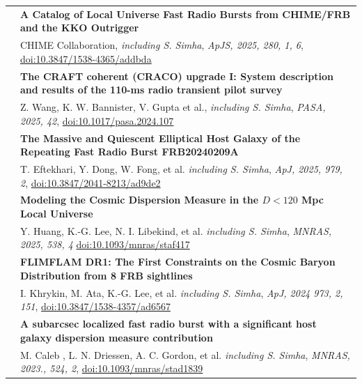 \documentclass[letterpaper, 11pt]{article}
\begin{document}
\begin{longtable}{p{1.3in}p{4.8in}}
& \textbf{A Catalog of Local Universe Fast Radio Bursts from CHIME/FRB and the KKO Outrigger}\\
& CHIME Collaboration, \textit{including S. Simha}, \textit{ApJS, 2025, 280, 1, 6}, \href{https://ui.adsabs.harvard.edu/link_gateway/2025ApJS..280....6C/doi:10.3847/1538-4365/addbda}{doi:10.3847/1538-4365/addbda}\\
& \textbf{The CRAFT coherent (CRACO) upgrade I: System description and results of the 110-ms radio transient pilot survey}\\
& Z. Wang, K. W. Bannister, V. Gupta et al., \textit{including S. Simha}, \textit{PASA, 2025, 42}, \href{https://ui.adsabs.harvard.edu/link_gateway/2025PASA...42....5W/doi:10.1017/pasa.2024.107}{doi:10.1017/pasa.2024.107}\\

& \textbf{The Massive and Quiescent Elliptical Host Galaxy of the Repeating Fast Radio Burst FRB20240209A} \\
& T. Eftekhari, Y. Dong, W. Fong, et al. \textit{including S. Simha}, \textit{ApJ,  2025, 979, 2}, \href{https://ui.adsabs.harvard.edu/link_gateway/2025ApJ...979L..22E/doi:10.3847/2041-8213/ad9de2}{doi:10.3847/2041-8213/ad9de2}\\

& \textbf{Modeling the Cosmic Dispersion Measure in the $D < 120$ Mpc Local Universe} \\
& Y. Huang, K.-G. Lee, N. I. Libekind, et al. \textit{including S. Simha}, \textit{MNRAS, 2025, 538, 4} \href{https://ui.adsabs.harvard.edu/link_gateway/2025MNRAS.538.2785H/doi:10.1093/mnras/staf417}{doi:10.1093/mnras/staf417}\\

& \textbf{FLIMFLAM DR1: The First Constraints on the Cosmic Baryon Distribution from 8 FRB sightlines} \\
& I. Khrykin, M. Ata, K.-G. Lee, et al. \textit{including S. Simha}, \textit{ApJ, 2024 973, 2, 151}, \href{https://ui.adsabs.harvard.edu/link_gateway/2024ApJ...973..151K/doi:10.3847/1538-4357/ad6567}{doi:10.3847/1538-4357/ad6567}\\

& \textbf{A subarcsec localized fast radio burst with a significant host galaxy dispersion measure contribution } \\
& M. Caleb , L. N. Driessen, A. C. Gordon, et al. \textit{including S. Simha}, \textit{MNRAS, 2023., 524, 2}, \href{https://ui.adsabs.harvard.edu/link_gateway/2023MNRAS.524.2064C/doi:10.1093/mnras/stad1839}{doi:10.1093/mnras/stad1839}\\


\end{longtable}
\end{document}
